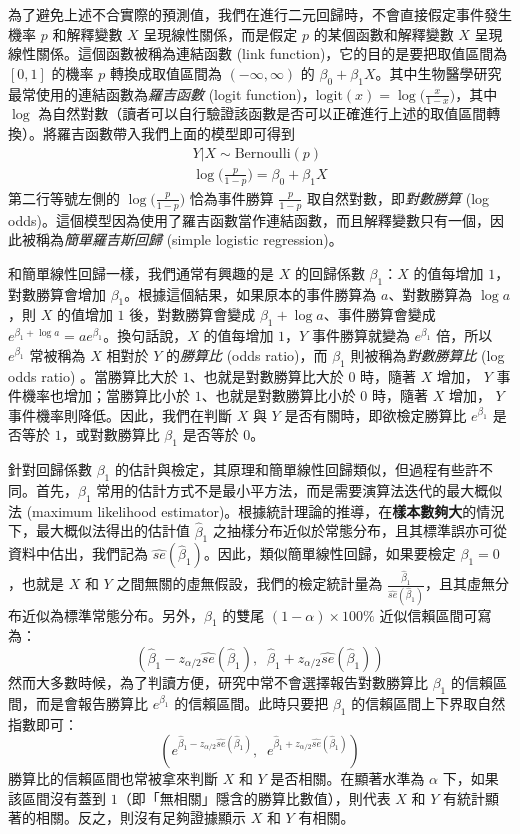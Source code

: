     為了避免上述不合實際的預測值，我們在進行二元回歸時，不會直接假定事件發生機率 $p$ 和解釋變數 $X$ 呈現線性關係，而是假定 $p$ 的某個函數和解釋變數 $X$ 呈現線性關係。這個函數被稱為連結函數 (link function)，它的目的是要把取值區間為 $[0,1]$ 的機率 $p$ 轉換成取值區間為 $(-\infty, \infty)$ 的 $\beta_0 + \beta_1 X$。其中生物醫學研究最常使用的連結函數為\textit{羅吉函數} (logit function)，$\text{logit}(x) = \log\big(\frac{x}{1-x}\big)$，其中 $\log$ 為自然對數（讀者可以自行驗證該函數是否可以正確進行上述的取值區間轉換）。將羅吉函數帶入我們上面的模型即可得到
    \begin{gather*}
        Y|X \sim \text{Bernoulli}(p)\\
        \log\Big(\frac{p}{1-p}\Big) = \beta_0 + \beta_1 X
    \end{gather*}
    第二行等號左側的 $\log\big(\frac{p}{1-p}\big)$ 恰為事件勝算 $\frac{p}{1-p}$ 取自然對數，即\textit{對數勝算} (log odds)。這個模型因為使用了羅吉函數當作連結函數，而且解釋變數只有一個，因此被稱為\textit{簡單羅吉斯回歸} (simple logistic regression)。
        
    和簡單線性回歸一樣，我們通常有興趣的是 $X$ 的回歸係數 $\beta_1$：$X$ 的值每增加 $1$，對數勝算會增加 $\beta_1$。根據這個結果，如果原本的事件勝算為 $a$、對數勝算為 $\log a$，則 $X$ 的值增加 $1$ 後，對數勝算會變成 $\beta_1 + \log a$、事件勝算會變成 $e^{\beta_1 + \log a} = ae^{\beta_1}$。換句話說，$X$ 的值每增加 $1$，$Y$ 事件勝算就變為 $e^{\beta_1}$ 倍，所以 $e^{\beta_1}$ 常被稱為 $X$ 相對於 $Y$ 的\textit{勝算比} (odds ratio)，而 $\beta_1$ 則被稱為\textit{對數勝算比} (log odds ratio) 。當勝算比大於 $1$、也就是對數勝算比大於 $0$ 時，隨著 $X$ 增加， $Y$ 事件機率也增加；當勝算比小於 $1$、也就是對數勝算比小於 $0$ 時，隨著 $X$ 增加， $Y$ 事件機率則降低。因此，我們在判斷 $X$ 與 $Y$ 是否有關時，即欲檢定勝算比 $e^{\beta_1}$ 是否等於 $1$，或對數勝算比 $\beta_1$ 是否等於 $0$。

    針對回歸係數 $\beta_1$ 的估計與檢定，其原理和簡單線性回歸類似，但過程有些許不同。首先，$\beta_1$ 常用的估計方式不是最小平方法，而是需要演算法迭代的最大概似法 (maximum likelihood estimator)。根據統計理論的推導，在\textbf{樣本數夠大}的情況下，最大概似法得出的估計值 $\hat{\beta}_1$ 之抽樣分布近似於常態分布，且其標準誤亦可從資料中估出，我們記為 $\widehat{se}(\hat{\beta}_1)$。因此，類似簡單線性回歸，如果要檢定 $\beta_1 = 0$，也就是 $X$ 和 $Y$ 之間無關的虛無假設，我們的檢定統計量為 $\frac{\hat{\beta}_1}{\widehat{se}(\hat{\beta}_1)}$，且其虛無分布近似為標準常態分布。另外，$\beta_1$ 的雙尾 $(1-\alpha)\times 100\%$ 近似信賴區間可寫為：
    \[(\hat{\beta}_1 - z_{\alpha/2} \widehat{se}(\hat{\beta}_1), \;\; \hat{\beta}_1 + z_{\alpha/2} \widehat{se}(\hat{\beta}_1))\]
    然而大多數時候，為了判讀方便，研究中常不會選擇報告對數勝算比 $\beta_1$ 的信賴區間，而是會報告勝算比 $e^{\beta_1}$ 的信賴區間。此時只要把 $\beta_1$ 的信賴區間上下界取自然指數即可：
    \[(e^{\hat{\beta}_1 - z_{\alpha/2} \widehat{se}(\hat{\beta}_1)}, \;\; e^{\hat{\beta}_1 + z_{\alpha/2} \widehat{se}(\hat{\beta}_1)})\]
    勝算比的信賴區間也常被拿來判斷 $X$ 和 $Y$ 是否相關。在顯著水準為 $\alpha$ 下，如果該區間沒有蓋到 $1$（即「無相關」隱含的勝算比數值），則代表 $X$ 和 $Y$ 有統計顯著的相關。反之，則沒有足夠證據顯示 $X$ 和 $Y$ 有相關。


